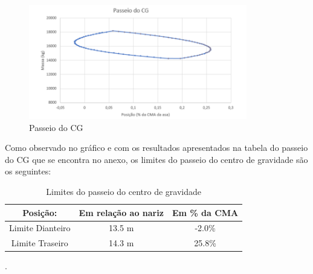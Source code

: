 \clearpage

\begin{figure}[H]
\centering
\includegraphics[width=0.85\textwidth]{images/parte3/passeioCG.PNG}
\caption{Passeio do CG}
\label{fig:passeioCG}
\end{figure}

Como observado no gráfico e com os resultados apresentados na tabela do passeio do CG que se encontra no anexo, os limites do passeio do centro de gravidade são os seguintes:


\begin{table}[H]
\centering
\begin{tabular}{ccc}
\toprule
 Posição: & Em relação ao nariz & Em \% da CMA  \\ \midrule
 Limite Dianteiro & 13.5 m & -2.0\% \\
 Limite Traseiro & 14.3 m & 25.8\% \\
\bottomrule
\end{tabular}
\caption{Limites do passeio do centro de gravidade}
\label{tbl:cg_limites}
\end{table}.

\clearpage
